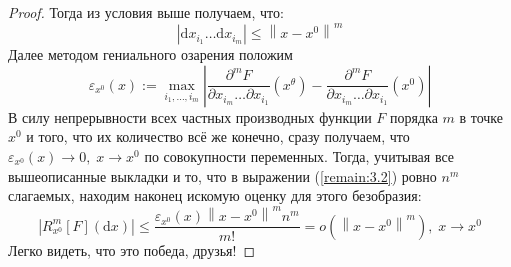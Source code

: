 \documentclass[11pt]{article}
\begin{document}
\begin{proof}
    Тогда из условия выше получаем, что:
    \[\left\lvert \mathrm{d} x_{i_1} \ldots \mathrm{d} x_{i_m} \right\rvert \leq \left\lVert x - x^0 \right\rVert^m \]
    Далее методом гениального озарения положим
    \[\varepsilon_{x^0} (x) := \max_{i_1, \ldots, i_m} \left\lvert \frac{\partial^m F}{\partial x_{i_m} \ldots \partial x_{i_1}} \left(x^{\theta}\right) - \frac{\partial^m F}{\partial x_{i_m} \ldots \partial x_{i_1}} \left(x^0\right) \right\rvert \]
    В силу непрерывности всех частных производных функции $F$ порядка $m$ в точке $x^0$ и того, что их количество всё же конечно, сразу получаем, что $\varepsilon_{x^0} (x) \to 0, \; x \to x^0$ по совокупности переменных. Тогда, учитывая все вышеописанные выкладки и то, что в выражении (\ref{remain:3.2}) ровно $n^m$ слагаемых, находим наконец 
    искомую оценку для этого безобразия:
    \[\left\lvert R_{x^0}^m[F](\mathrm{d} x) \right\rvert \leq \frac{\varepsilon_{x^0}(x) \left\lVert x - x^0 \right\rVert^m n^m}{m!} = o \left(\left\lVert x - x^0 \right\rVert^m \right), \; x \to x^0\]
    Легко видеть, что это победа, друзья!
\end{proof}
\end{document}
